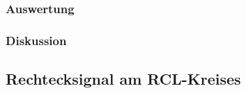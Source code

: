 \documentclass[12pt,a4paper]{article}
\begin{document}
\subsubsection{Auswertung}
\subsubsection{Diskussion}




\subsection{Rechtecksignal am RCL-Kreises}
\end{document}
